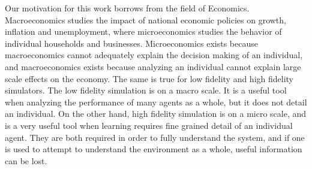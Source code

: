 \documentclass{sig-alternate}
\begin{document}
Our motivation for this work borrows from the field of Economics. Macroeconomics studies the impact of national economic policies on growth, inflation and unemployment, where microeconomics studies the behavior of individual households and businesses. Microeconomics exists because macroeconomics cannot adequately explain the decision making of an individual, and macroeconomics exists because analyzing an individual cannot explain large scale effects on the economy. The same is true for low fidelity and high fidelity simulators. The low fidelity simulation is on a macro scale. It is a useful tool when analyzing the performance of many agents as a whole, but it does not detail an individual. On the other hand, high fidelity simulation is on a micro scale, and is a very useful tool when learning requires fine grained detail of an individual agent. They are both required in order to fully understand the system, and if one is used to attempt to understand the environment as a whole, useful information can be lost.




\end{document}

